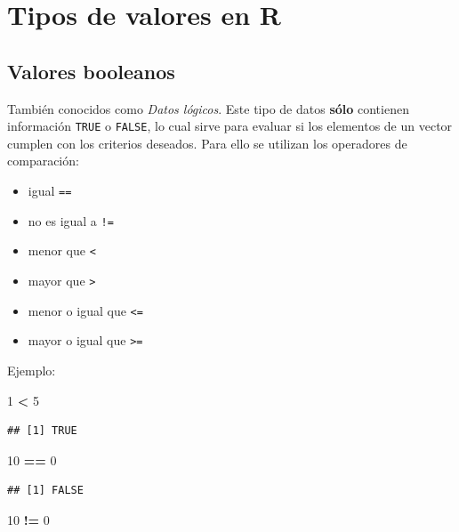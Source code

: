 \documentclass[
]{book}
\newenvironment{Shaded}{\begin{snugshade}}{\end{snugshade}}
\newcommand{\DecValTok}[1]{\textcolor[rgb]{0.00,0.00,0.81}{#1}}
\newcommand{\SpecialCharTok}[1]{\textcolor[rgb]{0.81,0.36,0.00}{\textbf{#1}}}
\providecommand{\tightlist}{%
  \setlength{\itemsep}{0pt}\setlength{\parskip}{0pt}}
\begin{document}
\section{Tipos de valores en R}\label{tipos-de-valores-en-r}

\subsection{Valores booleanos}\label{valores-booleanos}

También conocidos como \emph{Datos lógicos}.
Este tipo de datos \textbf{sólo} contienen información \texttt{TRUE} o \texttt{FALSE}, lo cual sirve para evaluar si los elementos de un vector cumplen con los criterios deseados. Para ello se utilizan los operadores de comparación:

\begin{itemize}
\tightlist
\item
  igual \texttt{==}
\item
  no es igual a \texttt{!=}
\item
  menor que \texttt{\textless{}}
\item
  mayor que \texttt{\textgreater{}}
\item
  menor o igual que \texttt{\textless{}=}
\item
  mayor o igual que \texttt{\textgreater{}=}
\end{itemize}

Ejemplo:

\begin{Shaded}
\begin{Highlighting}[]
\DecValTok{1} \SpecialCharTok{\textless{}} \DecValTok{5}
\end{Highlighting}
\end{Shaded}

\begin{verbatim}
## [1] TRUE
\end{verbatim}

\begin{Shaded}
\begin{Highlighting}[]
\DecValTok{10} \SpecialCharTok{==} \DecValTok{0}    
\end{Highlighting}
\end{Shaded}

\begin{verbatim}
## [1] FALSE
\end{verbatim}

\begin{Shaded}
\begin{Highlighting}[]
\DecValTok{10} \SpecialCharTok{!=} \DecValTok{0}   
\end{Highlighting}
\end{Shaded}
\end{document}
